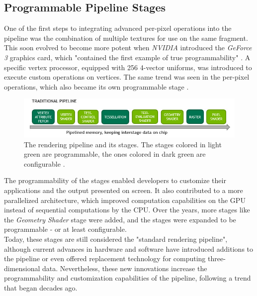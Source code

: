 \subsection*{Programmable Pipeline Stages}
 
One of the first steps to integrating advanced per-pixel operations into the pipeline was the combination of
multiple textures for use on the same fragment. This soon evolved to become more potent when \emph{NVIDIA} 
introduced the \emph{GeForce 3} graphics card, which "contained the first example of true programmability" 
\cite{KhronosProgramibility2024}. A specific vertex processor, equipped with 256 4-vector uniforms, was 
introduced to execute custom operations on vertices. The same trend was seen in the per-pixel operations, 
which also became its own programmable stage \cite{KhronosProgramibility2024}. \\

\begin{figure}[h]
    \centering
    \includegraphics[width=\linewidth]{images/graphics/traditional-rendering-pipeline.jpg}
    \caption{The rendering pipeline and its stages. The stages colored in light green are programmable, 
    the ones colored in dark green are configurable \cite{Kubisch2018}.}
    \label{fig:traditional-rendering-pipeline}
\end{figure}

\noindent
The programmability of the stages enabled developers to customize their applications and the output presented 
on screen. It also contributed to a more parallelized architecture, which improved computation capabilities on 
the \ac{GPU} instead of sequential computations by the \ac{CPU}. Over the years, more stages like the 
\emph{Geometry Shader} stage were added, and the stages were expanded to be programmable - or at least configurable. \\

\noindent
Today, these stages are still considered the "standard rendering pipeline", although current advances in 
hardware and software have introduced additions to the pipeline or even offered replacement technology 
for computing three-dimensional data. Nevertheless, these new innovations increase the programmability 
and customization capabilities of the pipeline, following a trend that began decades ago.


